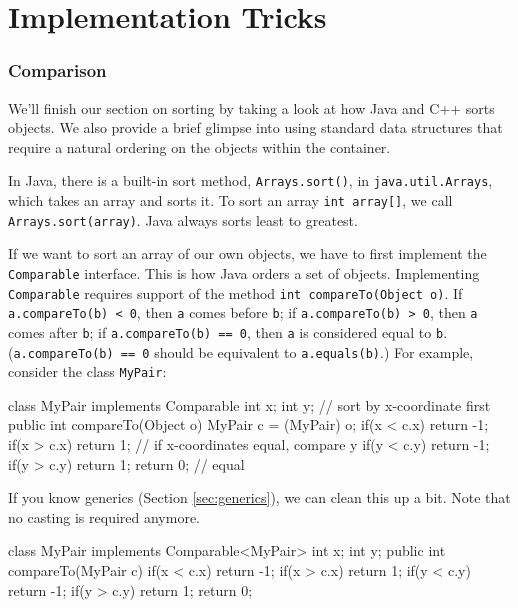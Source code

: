 \chapter{Implementation Tricks}

\subsection{Comparison}

We'll finish our section on sorting by taking a look at how Java and C++ sorts objects. We also provide a brief glimpse into using standard data structures that require a natural ordering on the objects within the container.

In Java, there is a built-in sort method, \texttt{Arrays.sort()}, in \texttt{java.util.Arrays}, which takes an array and sorts it. To sort an array \texttt{int array[]}, we call \texttt{Arrays.sort(array)}. Java always sorts least to greatest.

If we want to sort an array of our own objects, we have to first implement the \texttt{Comparable} interface. This is how Java orders a set of objects. Implementing \texttt{Comparable} requires support of the method \texttt{int compareTo(Object o)}. If \texttt{a.compareTo(b) < 0}, then \texttt{a} comes before \texttt{b}; if \texttt{a.compareTo(b) > 0}, then \texttt{a} comes after \texttt{b}; if \texttt{a.compareTo(b) == 0}, then \texttt{a} is considered equal to \texttt{b}. (\texttt{a.compareTo(b) == 0} should be equivalent to \texttt{a.equals(b)}.) For example, consider the class \texttt{MyPair}:

\begin{mylstlisting}
class MyPair implements Comparable {
	int x;
	int y;
    // sort by x-coordinate first
	public int compareTo(Object o) {
		MyPair c = (MyPair) o;
		if(x < c.x) return -1;
		if(x > c.x) return 1;
		// if x-coordinates equal, compare y
		if(y < c.y) return -1;
		if(y > c.y) return 1;
		return 0; // equal
	}
}
\end{mylstlisting}

If you know generics (Section \ref{sec:generics}), we can clean this up a bit. Note that no casting is required anymore.

\begin{mylstlisting}
class MyPair implements Comparable<MyPair> {
	int x;
	int y;
	public int compareTo(MyPair c) {
		if(x < c.x) return -1;
		if(x > c.x) return 1;
		if(y < c.y) return -1;
		if(y > c.y) return 1;
		return 0;
	}
}
\end{mylstlisting}

